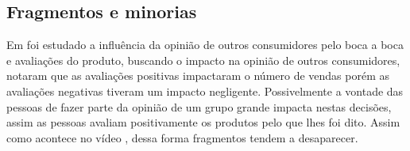 \subsection{Fragmentos e minorias}
Em \cite{chen_online_2011} foi estudado a influência da opinião de outros consumidores pelo boca a boca e avaliações do produto, buscando o impacto na opinião de outros consumidores, notaram que as avaliações positivas impactaram o número de vendas porém as avaliações negativas tiveram um impacto negligente. Possivelmente a vontade das pessoas de fazer parte da opinião de um grupo grande impacta nestas decisões, assim as pessoas avaliam positivamente os produtos pelo que lhes foi dito. Assim como acontece no vídeo \cite{linus_tech_tips_its_2022}, dessa forma fragmentos tendem a desaparecer.